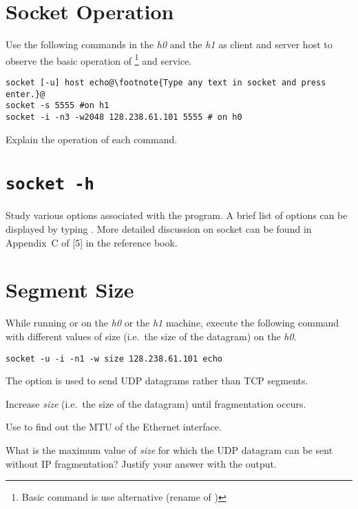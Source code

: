 \documentclass{../UTNetLab}
\begin{document}
\section{Socket Operation}
Use the following commands in the \textit{h0} and the \textit{h1} as client and server host to observe the basic operation of \footnote{Basic command is  use alternative  (rename of )} and  service.
\begin{lstlisting}[emph={host, h1,netlab},morekeywords={[3]echo}]
socket [-u] host echo@\footnote{Type any text in socket and press enter.}@
socket -s 5555 #on h1
socket -i -n3 -w2048 128.238.61.101 5555 # on h0
    \end{lstlisting}

\begin{report}
    \item Explain the operation of each command.
\end{report}

\section{\texttt{socket -h}}
Study various options associated with the  program.
A brief list of options can be displayed by typing .
More detailed discussion on socket can be found in Appendix~C of [5] in the reference book.

\section{Segment Size}
While running  or  on the \textit{h0} or the \textit{h1} machine, execute the following command with different values of size (i.e.\  the size of the datagram) on the \textit{h0}.

\begin{lstlisting}[emph={size, h1,netlab},morekeywords={[3]echo}]
socket -u -i -n1 -w size 128.238.61.101 echo
    \end{lstlisting}

The  option is used to send UDP datagrams rather than TCP segments.

Increase \textit{size} (i.e.\  the size of the datagram) until fragmentation occurs.

Use  to find out the MTU of the Ethernet interface.

\begin{report}
    \item What is the maximum value of \textit{size} for which the UDP datagram can be sent without IP fragmentation?
    Justify your answer with the  output.
\end{report}
\end{document}
